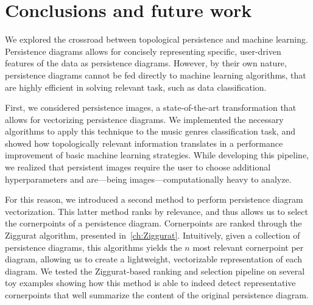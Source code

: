 \documentclass[english, LaM, oneside, noexaminfo]{sapthesis}
\begin{document}
\chapter*{Conclusions and future work}

We explored the crossroad between topological persistence and machine learning. Persistence diagrams allows for concisely representing specific, user-driven features of the data as persistence diagrams. However, by their own nature, persistence diagrams cannot be fed directly to machine learning algorithms, that are highly efficient in solving relevant task, such as data classification. 

First, we considered persistence images, a state-of-the-art transformation that allows for vectorizing persistence diagrams. We implemented the necessary algorithms to apply this technique to the music genres classification task, and showed how topologically relevant information translates in a performance improvement of basic machine learning strategies. While developing this pipeline, we realized that persistent images require the user to choose additional hyperparameters and are---being images---computationally heavy to analyze.

For this reason, we introduced a second method to perform persistence diagram vectorization. This latter method ranks by relevance, and thus allows us to select the cornerpoints of a persistence diagram. Cornerpoints are ranked through the Ziggurat algorithm, presented in~\cref{ch:Ziggurat}. Intuitively, given a collection of persistence diagrams, this algorithms yields the $n$ most relevant cornerpoint per diagram, allowing us to create a lightweight, vectorizable representation of each diagram. We tested the Ziggurat-based ranking and selection pipeline on several toy examples showing how this method is able to indeed detect representative cornerpoints that well summarize the content of the original persistence diagram.

\end{document}
